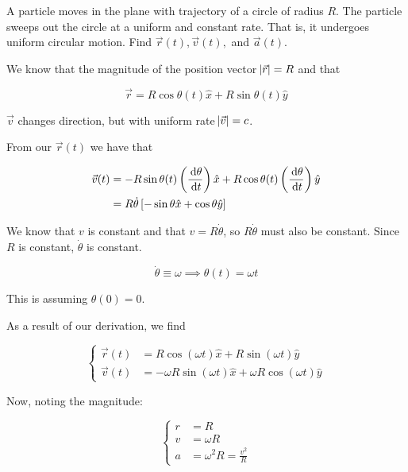 \begin{example}
	A particle moves in the plane with trajectory of a circle of radius $R$. The particle sweeps out the circle at a uniform and constant rate. That is, it undergoes uniform circular motion. Find $\vec r(t), \vec v(t),$ and $\vec a(t)$.
\end{example}

\begin{sol}

	We know that the magnitude of the position vector $\abs{\vec r} = R$ and that

	\begin{equation}
		\vec r = R\cos\theta(t) \hat x + R\sin\theta(t) \hat y
	\end{equation}

	\begin{remark}
		$\vec v$ changes direction, but with uniform rate $\abs{\vec v} = c$.
	\end{remark}

	From our $\vec r(t)$ we have that

	\begin{align}
		\vec v(t) &= -R\sin\theta(t) \left(\frac{\D \theta}{\D t}\right) \hat x + R\cos\theta(t) \left(\frac{\D \theta}{\D t}\right) \hat y\\
		&= R\dot\theta \left[-\sin\theta \hat x + \cos\theta \hat y\right]
	\end{align}

	We know that $v$ is constant and that $v = R\dot\theta$, so $R\dot\theta$ must also be constant. Since $R$ is constant, $\dot\theta$ is constant.

	\begin{equation}
		\dot\theta \equiv \omega \implies \theta(t) = \omega t
	\end{equation}

	This is assuming $\theta(0) = 0$.

	As a result of our derivation, we find

	\begin{equation}
		\begin{cases}
			\vec r(t) &= R\cos(\omega t)\hat x + R\sin(\omega t) \hat y\\
			\vec v(t) &= -\omega R\sin(\omega t) \hat x + \omega R\cos(\omega t) \hat y
		\end{cases}
	\end{equation}

	Now, noting the magnitude:

	\begin{equation}
		\begin{cases}
			r &= R\\
			v &= \omega R\\
			a &= \omega^2 R = \frac{v^2}{R}
		\end{cases}
	\end{equation}


\end{sol}

